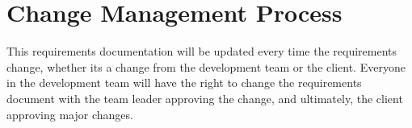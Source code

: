 \documentclass[12pt, a4paper]{article}
\begin{document}

	\section{Change Management Process}
	This requirements documentation will be updated every time the requirements change, whether its a change from the development team or the client. Everyone in the development team will have the right to change the requirements document with the team leader approving the change, and ultimately, the client approving major changes.

	\newpage
	\nocite{*}
	
	

	
\end{document}
